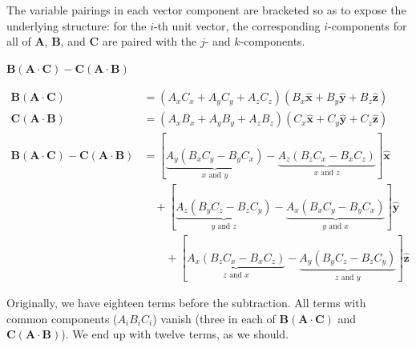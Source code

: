\documentclass[a4paper]{article}
\begin{document}
The variable pairings in each vector component are bracketed so as to expose the underlying structure: for the \( i \)-th unit vector, the corresponding \( i \)-components for all of \( \pmb{A} \),  \( \pmb{B} \), and \( \pmb{C} \) are paired with the \( j \)- and \( k \)-components.

\newpage

\underline{\( \pmb{B}\!\left( \pmb{A} \cdot \pmb{C} \right) - \pmb{C}\!\left( \pmb{A} \cdot \pmb{B} \right) \)}

\begin{align*}
	\pmb{B}\!\left( \pmb{A} \cdot \pmb{C} \right) & = \!\left( A_{x}C_{x} + A_{y}C_{y} + A_{z}C_{z} \right)\!\left( B_{x}\pmb{\hat{x}} + B_{y}\pmb{\hat{y}} + B_{z}\pmb{\hat{z}} \right) \\
	\pmb{C}\!\left( \pmb{A} \cdot \pmb{B} \right) & = \!\left( A_{x}B_{x} + A_{y}B_{y} + A_{z}B_{z} \right)\!\left( C_{x}\pmb{\hat{x}} + C_{y}\pmb{\hat{y}} + C_{z}\pmb{\hat{z}} \right) \\ 
	\pmb{B}\!\left( \pmb{A} \cdot \pmb{C} \right) - \pmb{C}\!\left( \pmb{A} \cdot \pmb{B} \right) & = \!\left[ \underbrace{A_{y}\!\left( B_{x}C_{y} - B_{y}C_{x} \right)}_{x \text{ and } y} - \underbrace{A_{z}\!\left( B_{z}C_{x} - B_{x}C_{z} \right)}_{x \text{ and } z} \right]\pmb{\hat{x}} \\
							       & \quad + \!\left[ \underbrace{A_{z}\!\left( B_{y}C_{z} - B_{z}C_{y} \right)}_{y \text{ and } z} - \underbrace{A_{x}\!\left( B_{x}C_{y} - B_{y}C_{x} \right)}_{y \text{ and } x} \right]\pmb{\hat{y}} \\
							       & \qquad + \!\left[ \underbrace{A_{x}\!\left( B_{z}C_{x} - B_{x}C_{z} \right)}_{z \text{ and } x} - \underbrace{A_{y}\!\left( B_{y}C_{z} - B_{z}C_{y} \right)}_{z \text{ and } y} \right]\pmb{\hat{z}}
\end{align*}

Originally, we have eighteen terms before the subtraction. All terms with common components (\( A_{i}B_{i}C_{i} \)) vanish (three in each of \( \pmb{B}\!\left( \pmb{A} \cdot \pmb{C} \right) \) and \( \pmb{C}\!\left( \pmb{A} \cdot \pmb{B} \right) \)). We end up with twelve terms, as we should.

\vspace{12pt}

\end{document}
